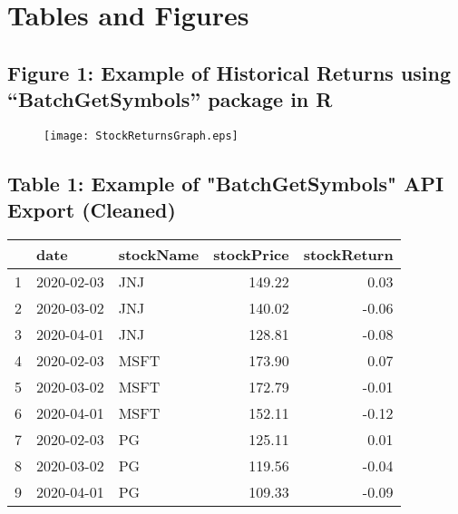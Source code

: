 \documentclass[12pt,english]{article}
\begin{document}
    \newpage
    \section{Tables and Figures}
        \subsection{Figure 1: Example of Historical Returns using “BatchGetSymbols” package in R}
            \begin{figure}
                \begin{center}
                    \texttt{[image: StockReturnsGraph.eps]}
                \end{center}
            \end{figure}
            
        \subsection{Table 1: Example of "BatchGetSymbols" API Export (Cleaned)}        
            \begin{center}
                \begin{table}[ht]
                \centering
                \begin{tabular}{rllrr}
                  \hline
                 & date & stockName & stockPrice & stockReturn \\ 
                  \hline
                1 & 2020-02-03 & JNJ & 149.22 & 0.03 \\ 
                  2 & 2020-03-02 & JNJ & 140.02 & -0.06 \\ 
                  3 & 2020-04-01 & JNJ & 128.81 & -0.08 \\ 
                  4 & 2020-02-03 & MSFT & 173.90 & 0.07 \\ 
                  5 & 2020-03-02 & MSFT & 172.79 & -0.01 \\ 
                  6 & 2020-04-01 & MSFT & 152.11 & -0.12 \\ 
                  7 & 2020-02-03 & PG & 125.11 & 0.01 \\ 
                  8 & 2020-03-02 & PG & 119.56 & -0.04 \\ 
                  9 & 2020-04-01 & PG & 109.33 & -0.09 \\ 
                   \hline
                \end{tabular}
                \end{table}
            \end{center}
        
\end{document}
